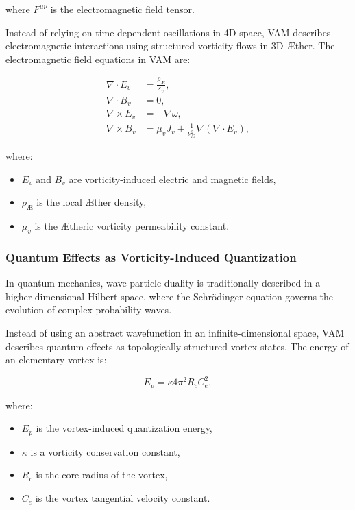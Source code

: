     where \( F^{\mu\nu} \) is the electromagnetic field tensor.

    Instead of relying on time-dependent oscillations in 4D space, VAM describes electromagnetic interactions using structured vorticity flows in 3D Æther. The electromagnetic field equations in VAM are:

    \begin{align}
        \nabla \cdot E_v &= \frac{\rho_{\text{Æ}}}{\varepsilon_v}, \\
        \nabla \cdot B_v &= 0, \\
        \nabla \times E_v &= -\nabla \omega, \\
        \nabla \times B_v &= \mu_v J_v + \frac{1}{\nu^2_{\text{Æ}}} \nabla(\nabla \cdot E_v),
    \end{align}

    where:
    \begin{itemize}
        \item \( E_v \) and \( B_v \) are vorticity-induced electric and magnetic fields,
        \item \( \rho_{\text{Æ}} \) is the local Æther density,
        \item \( \mu_v \) is the Ætheric vorticity permeability constant.
    \end{itemize}

    \subsubsection*{Quantum Effects as Vorticity-Induced Quantization}

    In quantum mechanics, wave-particle duality is traditionally described in a higher-dimensional Hilbert space, where the Schrödinger equation governs the evolution of complex probability waves.

    Instead of using an abstract wavefunction in an infinite-dimensional space, VAM describes quantum effects as topologically structured vortex states. The energy of an elementary vortex is:

    \begin{equation*}
        E_p = \kappa 4\pi^2 R_c C^2_e,
    \end{equation*}

    where:
    \begin{itemize}
        \item \( E_p \) is the vortex-induced quantization energy,
        \item \( \kappa \) is a vorticity conservation constant,
        \item \( R_c \) is the core radius of the vortex,
        \item \( C_e \) is the vortex tangential velocity constant.
    \end{itemize}


